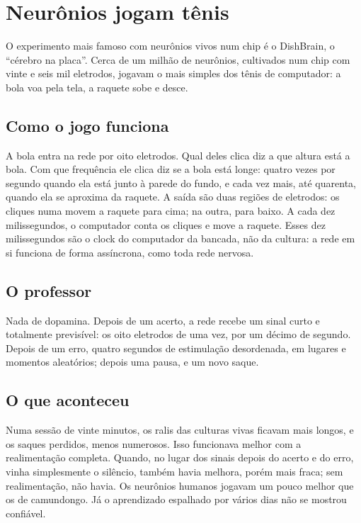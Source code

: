 \chapter{Neurônios jogam tênis}

O experimento mais famoso com neurônios vivos num chip é o DishBrain, o ``cérebro na placa''. Cerca de um milhão de neurônios, cultivados num chip com vinte e seis mil eletrodos, jogavam o mais simples dos tênis de computador: a bola voa pela tela, a raquete sobe e desce.

\section*{Como o jogo funciona}

A bola entra na rede por oito eletrodos. Qual deles clica diz a que altura está a bola. Com que frequência ele clica diz se a bola está longe: quatro vezes por segundo quando ela está junto à parede do fundo, e cada vez mais, até quarenta, quando ela se aproxima da raquete. A saída são duas regiões de eletrodos: os cliques numa movem a raquete para cima; na outra, para baixo. A cada dez milissegundos, o computador conta os cliques e move a raquete. Esses dez milissegundos são o clock do computador da bancada, não da cultura: a rede em si funciona de forma assíncrona, como toda rede nervosa.


\section*{O professor}

Nada de dopamina. Depois de um acerto, a rede recebe um sinal curto e totalmente previsível: os oito eletrodos de uma vez, por um décimo de segundo. Depois de um erro, quatro segundos de estimulação desordenada, em lugares e momentos aleatórios; depois uma pausa, e um novo saque.

\section*{O que aconteceu}

Numa sessão de vinte minutos, os ralis das culturas vivas ficavam mais longos, e os saques perdidos, menos numerosos. Isso funcionava melhor com a realimentação completa. Quando, no lugar dos sinais depois do acerto e do erro, vinha simplesmente o silêncio, também havia melhora, porém mais fraca; sem realimentação, não havia. Os neurônios humanos jogavam um pouco melhor que os de camundongo. Já o aprendizado espalhado por vários dias não se mostrou confiável.

